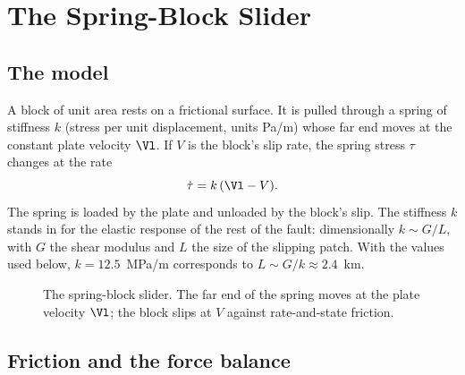 \section{The Spring-Block Slider}
\label{sec:l3-slider}

\subsection{The model}

A block of unit area rests on a frictional surface. It is pulled through a spring of stiffness $k$ (stress per unit displacement, units Pa/m) whose far end moves at the constant plate velocity $\Vl$. If $V$ is the block's slip rate, the spring stress $\tau$ changes at the rate
\begin{equation}
\dot\tau = k\,(\Vl - V).
\label{eq:l3-spring}
\end{equation}
The spring is loaded by the plate and unloaded by the block's slip. The stiffness $k$ stands in for the elastic response of the rest of the fault: dimensionally $k\sim G/L$, with $G$ the shear modulus and $L$ the size of the slipping patch. With the values used below, $k=12.5$~MPa/m corresponds to $L\sim G/k\approx2.4$~km.

\begin{figure}[ht]
\centering
{}
\caption{The spring-block slider. The far end of the spring moves at the plate velocity $\Vl$; the block slips at $V$ against rate-and-state friction.}
\label{fig:l3-slider}
\end{figure}

\subsection{Friction and the force balance}

